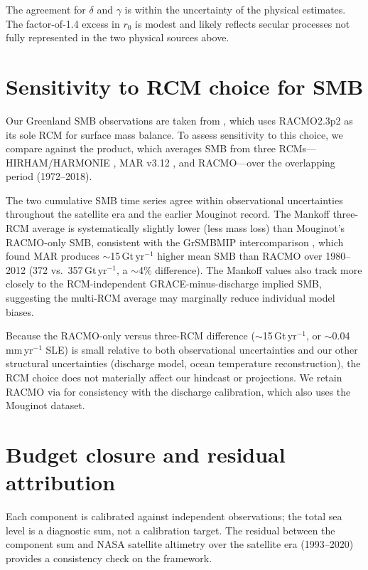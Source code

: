 \documentclass[11pt]{article}
\begin{document}
\noindent The agreement for $\delta$ and $\gamma$ is within the uncertainty of the physical estimates. The factor-of-1.4 excess in $r_0$ is modest and likely reflects secular processes not fully represented in the two physical sources above.

\section{Sensitivity to RCM choice for SMB}
\label{sec:rcm_sensitivity}

Our Greenland SMB observations are taken from \citet{Mouginot2019}, which uses RACMO2.3p2 \citep{Noel2018} as its sole RCM for surface mass balance. To assess sensitivity to this choice, we compare against the \citet{Mankoff2021} product, which averages SMB from three RCMs---HIRHAM/HARMONIE \citep{Langen2017}, MAR v3.12 \citep{Fettweis2020}, and RACMO---over the overlapping period (1972--2018).

The two cumulative SMB time series agree within observational uncertainties throughout the satellite era and the earlier Mouginot record. The Mankoff three-RCM average is systematically slightly lower (less mass loss) than Mouginot's RACMO-only SMB, consistent with the GrSMBMIP intercomparison \citep{Fettweis2020}, which found MAR produces $\sim$15\,Gt\,yr$^{-1}$ higher mean SMB than RACMO over 1980--2012 (372 vs.\ 357\,Gt\,yr$^{-1}$, a $\sim$4\% difference). The Mankoff values also track more closely to the RCM-independent GRACE-minus-discharge implied SMB, suggesting the multi-RCM average may marginally reduce individual model biases.

Because the RACMO-only versus three-RCM difference ($\sim$15\,Gt\,yr$^{-1}$, or $\sim$0.04\,mm\,yr$^{-1}$ SLE) is small relative to both observational uncertainties and our other structural uncertainties (discharge model, ocean temperature reconstruction), the RCM choice does not materially affect our hindcast or projections. We retain RACMO via \citet{Mouginot2019} for consistency with the discharge calibration, which also uses the Mouginot dataset.

\section{Budget closure and residual attribution}
\label{sec:budget_closure}

Each component is calibrated against independent observations; the total sea level is a diagnostic sum, not a calibration target. The residual between the component sum and NASA satellite altimetry over the satellite era (1993--2020) provides a consistency check on the framework.
\end{document}
